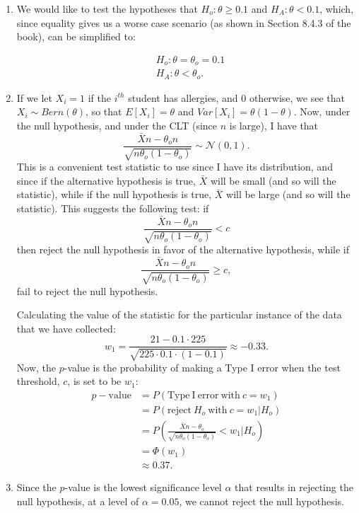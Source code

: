 \begin{problem}{20}$ $
\begin{enumerate}

\item We would like to test the hypotheses that $H_o: \theta \ge 0.1$ and $H_A:\theta <0.1$, which, since equality gives us a worse case scenario (as shown in Section 8.4.3 of the book), can be simplified to:

\begin{align*}
&H_o: \theta = \theta_o=0.1 \\
&H_A: \theta <\theta_o.
\end{align*}

\item If we let $X_i =1 $ if the $i^{th}$ student has allergies, and $0$ otherwise, we see that $X_i \sim Bern(\theta)$, so that $E[X_i] = \theta$ and $Var[X_i]= \theta(1-\theta)$.  Now, under the null hypothesis, and under the CLT (since $n$ is large), I have that
\begin{equation*}
\frac{\bar X n -\theta_o n}{\sqrt{n\theta_o(1-\theta_o)}} \sim \mathcal N(0, 1).
\end{equation*}
This is a convenient test statistic to use since I have its distribution, and since if the alternative hypothesis is true, $\bar X$ will be small (and so will the statistic), while if the null hypothesis is true, $\bar X$ will be large (and so will the statistic).  This suggests the following test: if 
\begin{equation*}
\frac{\bar X n -\theta_o n}{\sqrt{n\theta_o(1-\theta_o)}} < c
\end{equation*}
then reject the null hypothesis in favor of the alternative hypothesis, while if 
\begin{equation*}
\frac{\bar X n -\theta_o n}{\sqrt{n\theta_o(1-\theta_o)}} \ge c,
\end{equation*}
fail to reject the null hypothesis.

Calculating the value of the statistic for the particular instance of the data that we have collected:
\begin{equation*}
w_1 = \frac{21-0.1 \cdot 225}{\sqrt{225\cdot0.1\cdot(1-0.1)}} \approx -0.33.
\end{equation*}
Now, the $p$-value is the probability of making a Type I error when the test threshold, $c$, is set to be $w_1$:
\begin{align*}
p-\mathrm{value} &= P(\mathrm{Type~I~error~with}~c=w_1) \\
&= P(\mathrm{reject}~H_o~\mathrm{with}~c=w_1|H_o) \\
&= P\left (\frac{\bar X n -\theta_o}{\sqrt{n\theta_o(1-\theta_o)}}<w_1|H_o \right) \\
& = \Phi(w_1) \\
& \approx 0.37.
\end{align*}

\item  Since the $p$-value is the lowest significance level $\alpha$ that results in rejecting the null hypothesis, at a level of $\alpha=0.05$, we cannot reject the null hypothesis.

\end{enumerate}
\end{problem}

